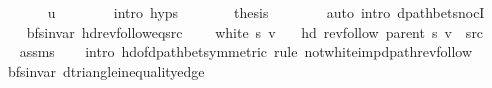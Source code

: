 \begin{isabellebody}
\ \ \ \ \ \ \isamarkupfalse%
\ u\isanewline
\ \ \ \ \ \ \isamarkupfalse%
\ {\isacharparenleft}{\kern0pt}intro\ {\isachardoublequoteopen}{}{\isachardot}{\kern0pt}hyps{\isachardoublequoteclose}{\isacharparenright}{\kern0pt}\isanewline
\ \ \ \ \isamarkupfalse%
\ \isamarkupfalse%
\ {\isacharquery}{\kern0pt}thesis\isanewline
\ \ \ \ \ \ \isamarkupfalse%
\ {\isacharparenleft}{\kern0pt}auto\ intro{\isacharcolon}{\kern0pt}\ dpath{\isacharunderscore}{\kern0pt}bet{\isacharunderscore}{\kern0pt}snocI{\isacharparenright}{\kern0pt}\isanewline
\ \ \isamarkupfalse%
\isanewline
{}\isamarkupfalse%
%
\endisatagproof
{\isafoldproof}%
%
\isadelimproof
\isanewline
%
\endisadelimproof
\isanewline
{}\isamarkupfalse%
\ {\isacharparenleft}{\kern0pt}\ bfs{\isacharunderscore}{\kern0pt}invar{\isacharparenright}{\kern0pt}\ hd{\isacharunderscore}{\kern0pt}rev{\isacharunderscore}{\kern0pt}follow{\isacharunderscore}{\kern0pt}eq{\isacharunderscore}{\kern0pt}src{\isacharcolon}{\kern0pt}\isanewline
\ \ \ {\isachardoublequoteopen}{\isasymnot}\ white\ s\ v{\isachardoublequoteclose}\isanewline
\ \ \ {\isachardoublequoteopen}hd\ {\isacharparenleft}{\kern0pt}rev{\isacharunderscore}{\kern0pt}follow\ {\isacharparenleft}{\kern0pt}parent\ s{\isacharparenright}{\kern0pt}\ v{\isacharparenright}{\kern0pt}\ {\isacharequal}{\kern0pt}\ src{\isachardoublequoteclose}\isanewline
%
\isadelimproof
\ \ %
\endisadelimproof
%
\isatagproof
{}\isamarkupfalse%
\ assms\isanewline
\ \ \isamarkupfalse%
\ {\isacharparenleft}{\kern0pt}intro\ hd{\isacharunderscore}{\kern0pt}of{\isacharunderscore}{\kern0pt}dpath{\isacharunderscore}{\kern0pt}bet{\isacharprime}{\kern0pt}{\isacharbrackleft}{\kern0pt}symmetric{\isacharbrackright}{\kern0pt}{\isacharparenright}{\kern0pt}\ {\isacharparenleft}{\kern0pt}rule\ not{\isacharunderscore}{\kern0pt}white{\isacharunderscore}{\kern0pt}imp{\isacharunderscore}{\kern0pt}dpath{\isacharunderscore}{\kern0pt}rev{\isacharunderscore}{\kern0pt}follow{\isacharparenright}{\kern0pt}%
\endisatagproof
{\isafoldproof}%
%
\isadelimproof
\isanewline
%
\endisadelimproof
\isanewline
\isanewline
\isanewline
\isanewline
\isanewline
{}\isamarkupfalse%
\ {\isacharparenleft}{\kern0pt}\ bfs{\isacharunderscore}{\kern0pt}invar{\isacharparenright}{\kern0pt}\ d{\isacharunderscore}{\kern0pt}triangle{\isacharunderscore}{\kern0pt}inequality{\isacharunderscore}{\kern0pt}edge{\isacharcolon}{\kern0pt}\isanewline

\end{isabellebody}
